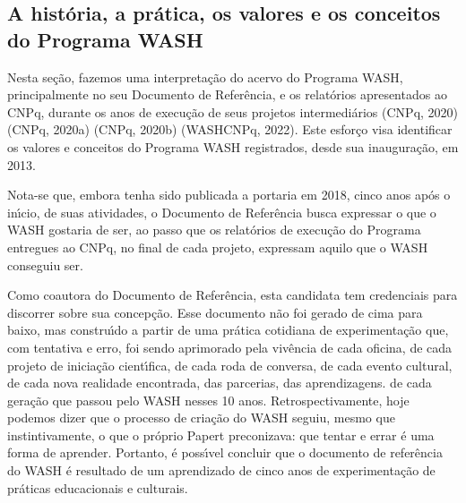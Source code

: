 \documentclass[
12pt,		%
openright,	%
twoside,  %
a4paper,			%
chapter=TITLE,		%
english,			%
french,				%
spanish,			%
brazil				%
]{USPSC-classe/USPSC}
\begin{document}
\subsection[A hist\'oria, a pr\'atica, os valores e os conceitos do Programa WASH]{A hist\'oria, a pr\'atica, os valores e os conceitos do Programa WASH}\label{A hist\'oria, a pr\'atica, os valores e os conceitos do Programa WASH}
Nesta se\c{c}\~ao, fazemos uma interpreta\c{c}\~ao do acervo do Programa WASH, principalmente no seu Documento de Refer\^encia, e os relat\'orios apresentados ao CNPq, durante os anos de execu\c{c}\~ao de seus projetos intermedi\'arios  (CNPq, 2020)   (CNPq, 2020a)  (CNPq, 2020b)  (WASHCNPq, 2022). Este esfor\c{c}o visa identificar os valores e conceitos do Programa WASH registrados, desde sua inaugura\c{c}\~ao, em 2013.

















Nota-se que, embora tenha sido publicada a portaria em 2018, cinco anos ap\'os o in\'{\i}cio, de suas atividades, o Documento de Refer\^encia busca expressar \textquotedbl o que o WASH gostaria de ser\textquotedbl , ao passo que os relat\'orios de execu\c{c}\~ao do Programa entregues ao CNPq, no final de cada projeto, expressam \textquotedbl aquilo que o WASH conseguiu ser\textquotedbl .

















Como coautora do Documento de Refer\^encia, esta candidata tem credenciais para discorrer sobre sua concep\c{c}\~ao. Esse documento n\~ao foi gerado de cima para baixo, mas constru\'{\i}do a partir de uma pr\'atica cotidiana de experimenta\c{c}\~ao que, com  \textquotedbl tentativa e erro\textquotedbl , foi sendo aprimorado pela viv\^encia de cada oficina, de cada projeto de inicia\c{c}\~ao cient\'{\i}fica, de cada roda de conversa, de cada  evento cultural, de cada nova realidade encontrada, das parcerias, das aprendizagens. de cada gera\c{c}\~ao que passou pelo WASH nesses 10 anos. Retrospectivamente, hoje podemos dizer que o processo de cria\c{c}\~ao do WASH seguiu, mesmo que instintivamente, o que o pr\'oprio Papert preconizava: que tentar e errar \'e uma forma de aprender. Portanto, \'e poss\'{\i}vel concluir que o documento de refer\^encia do WASH \'e resultado de um aprendizado de cinco anos de experimenta\c{c}\~ao de pr\'aticas educacionais e culturais.
\end{document}
